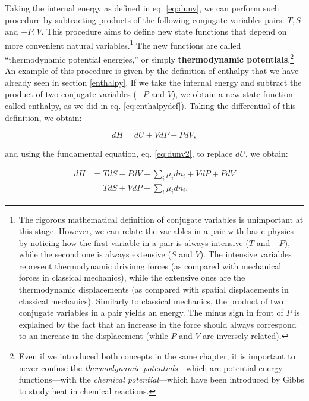 \documentclass[
]{book}
\theoremstyle{definition}
\theoremstyle{definition}
\theoremstyle{definition}
\theoremstyle{remark}
\begin{document}
Taking the internal energy as defined in eq. \eqref{eq:dunv}, we can perform such procedure by subtracting products of the following conjugate variables pairs: \(T, S\) and \(-P, V\). This procedure aims to define new state functions that depend on more convenient natural variables.\footnote{The rigorous mathematical definition of conjugate variables is unimportant at this stage. However, we can relate the variables in a pair with basic physics by noticing how the first variable in a pair is always intensive (\(T\) and \(-P\)), while the second one is always extensive (\(S\) and \(V\)). The intensive variables represent thermodynamic drivinng forces (as compared with mechanical forces in classical mechanics), while the extensive ones are the thermodynamic displacements (as compared with spatial displacements in classical mechanics). Similarly to classical mechanics, the product of two conjugate variables in a pair yields an energy. The minus sign in front of \(P\) is explained by the fact that an increase in the force should always correspond to an increase in the displacement (while \(P\) and \(V\) are inversely related).} The new functions are called ``thermodynamic potential energies,'' or simply \textbf{thermodynamic potentials}.\footnote{Even if we introduced both concepts in the same chapter, it is important to never confuse the \emph{thermodynamic potentials}---which are potential energy functions---with the \emph{chemical potential}---which have been introduced by Gibbs to study heat in chemical reactions.} An example of this procedure is given by the definition of enthalpy that we have already seen in section \ref{enthalpy}. If we take the internal energy and subtract the product of two conjugate variables (\(-P\) and \(V\)), we obtain a new state function called enthalpy, as we did in eq. \eqref{eq:enthalpydef}). Taking the differential of this definition, we obtain:

\begin{equation}
dH = dU +VdP +PdV,
\label{eq:dhdef1}
\end{equation}

and using the fundamental equation, eq. \eqref{eq:dunv2}, to replace \(dU\), we obtain:

\begin{equation}
\begin{aligned}
dH & = TdS -PdV +\sum_i\mu_i dn_i +VdP +PdV  \\
   & = TdS +VdP +\sum_i\mu_i dn_i.
\end{aligned}
\label{eq:dhdef2}
\end{equation}
\end{document}
